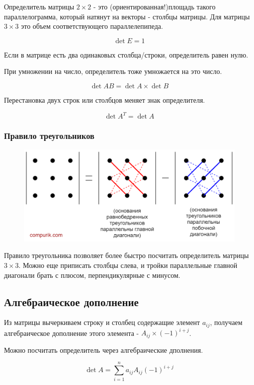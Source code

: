 \documentclass{article}
\begin{document}
Определитель матрицы $2\times2$ - это (ориентированная!)площадь такого параллелограмма, который натянут на векторы - столбцы матрицы. Для матрицы $3\times 3$ это объем соответствующего параллелепипеда.

$$\det E =1$$

Если в матрице есть два одинаковых столбца/строки, определитель равен нулю. 

При умножении на число, определитель тоже умножается на это число.

$$\det AB = \det A \times \det B$$

Перестановка двух строк или столбцов меняет знак определителя.

$$\det A^T = \det A$$

\subsubsection*{Правило треугольников}
\begin{figure}[htp]
\centering
\includegraphics[scale=.400]{triangle.png}
\end{figure}

Правило треугольника позволяет более быстро посчитать определитель матрицы $3\times 3$. Можно еще приписать столбцы слева, и тройки параллельные главной диагонали брать с плюсом, перпендикулярные с минусом.


\subsection*{Алгебраическое дополнение}

Из матрицы вычеркиваем строку и столбец содержащие элемент $a_{ij}$, получаем алгебраическое дополнение этого элемента - $A_{ij}\times (-1)^{i+j}$. 

Можно посчитать определитель через алгебраические дполнения.

$$\det A = \sum_{i=1}^n a_{ij}A_{ij}(-1)^{i+j}$$
\end{document}
